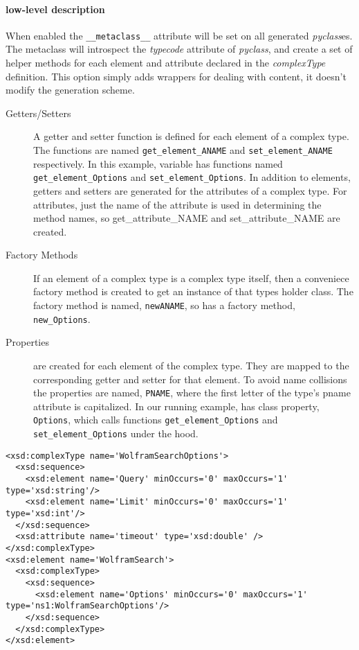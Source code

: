\paragraph{low-level description}
When enabled the \verb!__metaclass__! attribute will be set on all generated 
{\it pyclass}es.  The metaclass will introspect the {\it typecode} attribute of 
{\it pyclass}, and create a set of helper methods for each element
and attribute declared in the {\it complexType} definition.  This option simply
adds wrappers for dealing with content, it doesn't modify the generation scheme.

\begin{description}
\item[Getters/Setters] A getter and setter function is defined for each element
of a complex type.  The functions are named \verb!get_element_ANAME! and
\verb!set_element_ANAME! respectively.  In this example, variable 
has functions named \verb!get_element_Options! and \verb!set_element_Options!.
 In addition to elements, getters and setters are generated for the attributes
 of a complex type.  For attributes, just the name of the attribute is used in
 determining the method names, so get_attribute_NAME and set_attribute_NAME are
 created.

\item[Factory Methods] If an element of a complex type is a complex type itself,
then a conveniece factory method is created to get an instance of that types
holder class.  The factory method is named, \verb!newANAME!, so  has
a factory method, \verb!new_Options!.

\item[Properties]
are created for each element of the complex type.  They are mapped to the
corresponding getter and setter for that element.  To avoid name collisions the
properties are named, \verb!PNAME!, where the first letter of the type's pname
attribute is capitalized.  In our running example,  has class
property, \verb!Options!, which calls functions \verb!get_element_Options! and
\verb!set_element_Options! under the hood.

\end{description}


\begin{verbatim}
<xsd:complexType name='WolframSearchOptions'>
  <xsd:sequence>
    <xsd:element name='Query' minOccurs='0' maxOccurs='1' type='xsd:string'/>
    <xsd:element name='Limit' minOccurs='0' maxOccurs='1' type='xsd:int'/>
  </xsd:sequence>
  <xsd:attribute name='timeout' type='xsd:double' />
</xsd:complexType>
<xsd:element name='WolframSearch'>
  <xsd:complexType>
    <xsd:sequence>
      <xsd:element name='Options' minOccurs='0' maxOccurs='1' type='ns1:WolframSearchOptions'/>
    </xsd:sequence>
  </xsd:complexType>
</xsd:element>
\end{verbatim}

